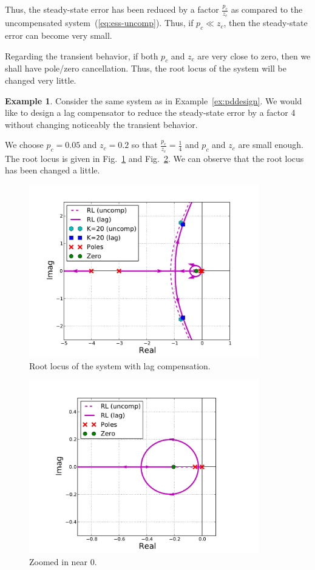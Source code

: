 \documentclass[a4paper,11pt]{report}
\theoremstyle{definition}
\newtheorem{mdexample}{Example}
\newenvironment{example}%
  {\vspace{0.1cm}\begin{mdframed}[backgroundcolor=lightgray]\begin{mdexample}}%
  {\end{mdexample}\end{mdframed}\vspace{0.1cm}}
\begin{document}
Thus, the steady-state error has been reduced by a factor
$\frac{p_c}{z_c}$ as compared to the uncompensated
system~(\ref{eq:ess-uncomp}). Thus, if $p_c\ll z_c$, then the
steady-state error can become very small.

Regarding the transient behavior, if both $p_c$ and $z_c$ are very
close to zero, then we shall have pole/zero cancellation. Thus, the
root locus of the system will be changed very little.

\begin{example}
  \label{ex:lag}
  Consider the same system as in Example~\ref{ex:pddesign}. We would
  like to design a lag compensator to reduce the steady-state error by
  a factor 4 without changing noticeably the transient behavior.

  We choose $p_c=0.05$ and $z_c=0.2$ so that
  $\frac{p_c}{z_c}=\frac{1}{4}$ and $p_c$ and $z_c$ are small
  enough. The root locus is given in Fig.~\ref{fig:design-lag} and
  Fig.~\ref{fig:design-lag-zoom}. We can observe that the root locus
  has been changed a little.

  \begin{figure}[H]
    \centering
    \includegraphics[width=10cm]{fig/design-lag.pdf}
    \caption{Root locus of the system with lag compensation.}
    \label{fig:design-lag}
  \end{figure}

  \begin{figure}[H]
    \centering
    \includegraphics[width=10cm]{fig/design-lag-zoom.pdf}
    \caption{Zoomed in near 0.}
    \label{fig:design-lag-zoom}
  \end{figure}


\end{example}
\end{document}
